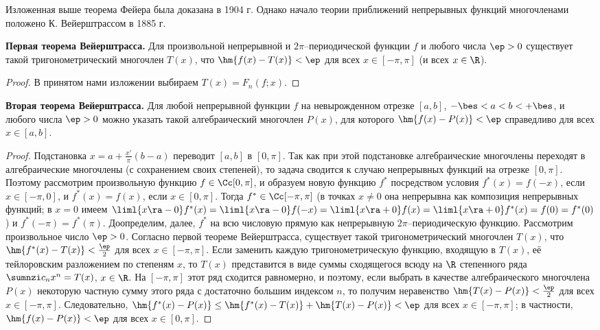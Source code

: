 \documentclass[a4paper]{article}
\begin{document}
Изложенная выше теорема Фейера была доказана в 1904 г. Однако начало
теории приближений непрерывных функций многочленами положено К.
Вейерштрассом в 1885 г.

\textbf{Первая теорема Вейерштрасса.} Для произвольной непрерывной и
$2\pi$--периодической функции $f$ и любого числа $\ep>0$ существует
такой тригонометрический многочлен $T(x)$, что $\hm{f(x) -
T(x)}<\ep$ для всех $x\in[-\pi,\pi]$ (и всех $x\in\R$).

\begin{proof}
В принятом нами изложении выбираем $T(x) = F_n(f;x)$.
\end{proof}

\textbf{Вторая теорема Вейерштрасса.} Для любой непрерывной функции
$f$ на невырожденном отрезке $[a,b]$, $-\bes<a<b<+\bes$, и любого
числа $\ep>0$ можно указать такой алгебраический многочлен $P(x)$,
для которого $\hm{f(x) - P(x)}<\ep$ справедливо для всех
$x\in[a,b]$.

\begin{proof}
Подстановка $x = a + \frac{x'}{\pi}(b-a)$ переводит $[a,b]$ в
$[0,\pi]$. Так как при этой подстановке алгебраические многочлены
переходят в алгебраические многочлены (с сохранением своих
степеней), то задача сводится к случаю непрерывных функций на
отрезке $[0,\pi]$. Поэтому рассмотрим произвольную функцию
$f\in\Cc[0,\pi]$, и образуем новую функцию $f^*$ посредством условия
$f^*(x) = f(-x)$, если $x\in[-\pi,0]$, и $f^*(x) = f(x)$, если
$x\in[0,\pi]$. Тогда $f^*\in\Cc[-\pi,\pi]$ (в точках $x\ne0$ она
непрерывна как композиция непрерывных функций; в $x=0$ имеем
$\liml{x\ra-0}f^*(x) = \liml{x\ra-0} f(-x) = \liml{x\ra+0} f(x) =
\liml{x\ra+0} f^*(x) = f(0) = f^*(0)$) и $f^*(-\pi) = f^*(\pi)$.
Доопределим, далее, $f^*$ на всю числовую прямую как непрерывную
$2\pi$--периодическую функцию. Рассмотрим произвольное число
$\ep>0$. Согласно первой теореме Вейерштрасса, существует такой
тригонометрический многочлен $T(x)$, что $\hm{f^*(x) - T(x)} <
\frac{\ep}2$ для всех $x\in[-\pi,\pi]$. Если заменить каждую
тригонометрическую функцию, входящую в $T(x)$, её тейлоровским
разложением по степеням $x$, то $T(x)$ представится в виде суммы
сходящегося всюду на $\R$ степенного ряда $\sumnzi c_nx^n = T(x)$,
$x\in\R$. На $[-\pi,\pi]$ этот ряд сходится равномерно, и поэтому,
если выбрать в качестве алгебраического многочлена $P(x)$ некоторую
частную сумму этого ряда с достаточно большим индексом $n$, то
получим неравенство $\hm{T(x) - P(x)}<\frac{\ep}2$ для всех
$x\in[-\pi,\pi]$. Следовательно, $\hm{f^*(x) - P(x)} \le \hm{f^*(x)
- T(x)} + \hm{T(x) - P(x)} < \ep$ для всех $x\in[-\pi,\pi]$; в
частности, $\hm{f(x) - P(x)}<\ep$ для всех $x\in[0,\pi]$.
\end{proof}
\end{document}
